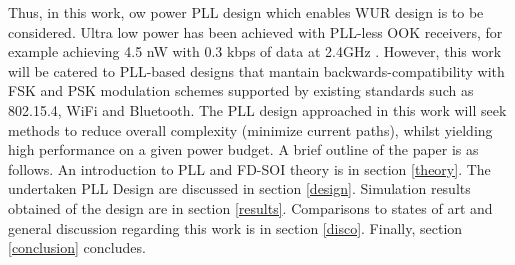 Thus, in this work, ow power PLL design which enables WUR design is to be considered. Ultra low power has been achieved with PLL-less OOK receivers, for example achieving 4.5 nW with 0.3 kbps of data at 2.4GHz \cite{Jiang2017}. However, this work will be catered to PLL-based designs that mantain backwards-compatibility with FSK and PSK modulation schemes supported by existing standards such as 802.15.4, WiFi and Bluetooth. The PLL design approached in this work will seek methods to reduce overall complexity (minimize current paths), whilst yielding high performance on a given power budget. A brief outline of the paper is as follows. An introduction to PLL and FD-SOI theory is in section \ref{theory}. The undertaken PLL Design are discussed in section \ref{design}. Simulation results obtained of the design are in section \ref{results}. Comparisons to states of art and general discussion regarding this work is in section \ref{disco}. Finally, section \ref{conclusion} concludes. 
%
%
%
%
